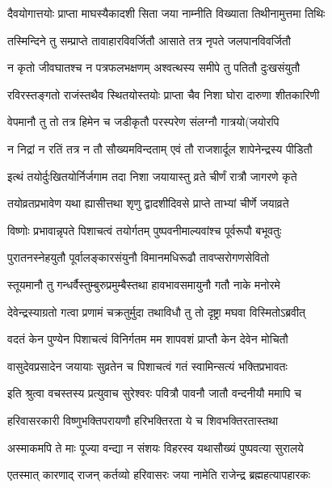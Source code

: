 \twolineshloka
{दैवयोगात्तयोः प्राप्ता माघस्यैकादशी सिता}
{जया नाम्नीति विख्याता तिथीनामुत्तमा तिथिः} %

\twolineshloka
{तस्मिन्दिने तु सम्प्राप्ते तावाहारविवर्जितौ}
{आसाते तत्र नृपते जलपानविवर्जितौ} %

\twolineshloka
{न कृतो जीवघातश्च न पत्रफलभक्षणम्}
{अश्वत्थस्य समीपे तु पतितौ दुःखसंयुतौ} %

\twolineshloka
{रविरस्तङ्गतो राजंस्तथैव स्थितयोस्तयोः}
{प्राप्ता चैव निशा घोरा दारुणा शीतकारिणी} %

\twolineshloka
{वेपमानौ तु तो तत्र हिमेन च जडीकृतौ}
{परस्परेण संलग्नौ गात्रयो(जयोरपि} %

\twolineshloka
{न निद्रां न रतिं तत्र न तौ सौख्यमविन्दताम्}
{एवं तौ राजशार्दूल शापेनेन्द्रस्य पीडितौ} %

\twolineshloka
{इत्थं तयोर्दुःखितयोर्निर्जगाम तदा निशा}
{जयायास्तु व्रते चीर्णं रात्रौ जागरणे कृते} %

\twolineshloka
{तयोव्रतप्रभावेण यथा ह्यासीत्तथा शृणु}
{द्वादशीदिवसे प्राप्ते ताभ्यां चीर्णे जयाव्रते} %

\twolineshloka
{विष्णोः प्रभावान्नृपते पिशाचत्वं तयोर्गतम्}
{पुष्पवनीमाल्यवांश्च पूर्वरूपौ बभूवतुः} %

\twolineshloka
{पुरातनस्नेहयुतौ पूर्वालङ्कारसंयुनौ}
{विमानमधिरूढौ तावप्सरोगणसेवितो} %

\twolineshloka
{स्तूयमानौ तु गन्धर्वैस्तुम्बुरुप्रमुम्बैस्तथा}
{हावभावसमायुनौ गतौ नाके मनोरमे} %

\twolineshloka
{देवेन्द्रस्याग्रतो गत्वा प्रणामं चक्रतुर्मुदा}
{तथाविधौ तु तो दृष्ट्रा मघवा विस्मितोऽब्रवीत्} %


\twolineshloka
{वदतं केन पुण्येन पिशाचत्वं विनिर्गतम}
{मम शापवशं प्राप्तौ केन देवेन मोचितौ} %


\twolineshloka
{वासुदेवप्रसादेन जयायाः सुव्रतेन च}
{पिशाचत्वं गतं स्वामिन्सत्यं भक्तिप्रभावतः} %

\twolineshloka
{इति श्रुत्वा वचस्तस्य प्रत्युवाच सुरेश्वरः}
{पवित्रौ पावनौ जातौ वन्दनीयौ ममापि च} %

\twolineshloka
{हरिवासरकारी विष्णुभक्तिपरायणौ}
{हरिभक्तिरता ये च शिवभक्तिरतास्तथा} %

\twolineshloka
{अस्माकमपि ते माः पूज्या वन्द्या न संशयः}
{विहरस्व यथासौख्यं पुष्पवत्या सुरालये} %

\twolineshloka
{एतस्मात् कारणाद् राजन् कर्तव्यो हरिवासरः}
{जया नामेति राजेन्द्र ब्रह्महत्यापहारकः} %

